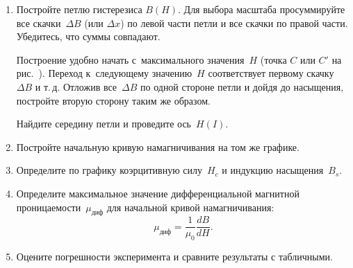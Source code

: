 \begin{lab:task}
\begin{enumerate}
		\item Постройте петлю гистерезиса $B(H)$. Для выбора масштаба
просуммируйте все скачки~$\Delta B$ (или $\Delta x$) по левой части
		петли и все скачки по правой части. Убедитесь, что суммы совпадают.

		Построение удобно начать с~максимального значения~$H$ (точка $C$ или
$C'$ на рис.~). Переход к~следующему
значению~$H$ соответствует первому скачку~$\Delta B$ и т.\,д.
Отложив все~$\Delta B$ по одной стороне петли и дойдя до насыщения, постройте
вторую сторону таким же образом.

		Найдите середину петли и проведите ось~$H(I)$.

		\item Постройте начальную кривую намагничивания на том же графике.

		\item Определите по графику коэрцитивную силу~$H_c$ и индукцию
насыщения~$B_s$.

		\item Определите максимальное значение дифференциальной магнитной
проницаемости~$\mu_\text{диф}$ для начальной кривой
		намагничивания:
		\begin{equation*}
			\mu_\text{диф}=\frac{1}{\mu_0}\frac{dB}{dH}.
		\end{equation*}

		\item Оцените погрешности эксперимента и сравните
        результаты с табличными.


	\end{enumerate}

\end{lab:task}

